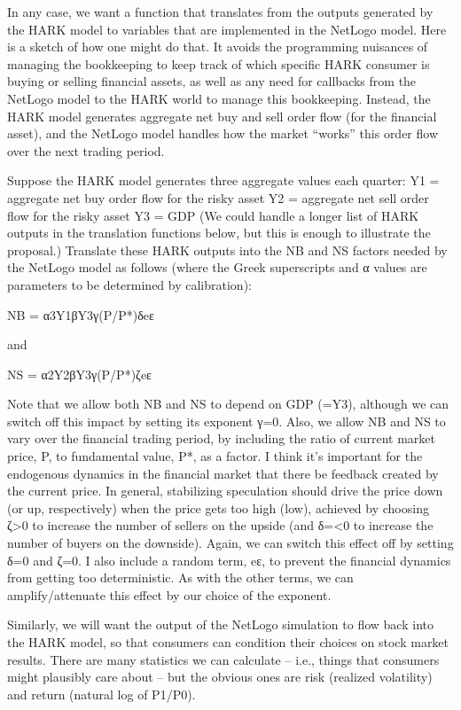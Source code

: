 In any case, we want a function that translates from the outputs
generated by the HARK model to variables that are implemented in
the NetLogo model. Here is a sketch of how one might do that.
It avoids the programming nuisances of managing the bookkeeping
to keep track of which specific HARK consumer is buying or
selling financial assets, as well as any need for callbacks from the
NetLogo model to the HARK world to manage this bookkeeping. Instead,
the HARK model generates aggregate net buy and sell order flow (for
the financial asset), and the NetLogo model handles how the market
“works” this order flow over the next trading period. 

Suppose the HARK model generates three aggregate values each quarter:
Y1 = aggregate net buy order flow for the risky asset
Y2 = aggregate net sell order flow for the risky asset
Y3 = GDP
(We could handle a longer list of HARK outputs in the translation
functions below, but this is enough to illustrate the proposal.)
Translate these HARK outputs into the NB and NS factors needed by the
NetLogo model as follows (where the Greek superscripts and α values are
parameters to be determined by calibration):

NB = α3Y1βY3γ(P/P*)δeε

and
 
NS = α2Y2βY3γ(P/P*)ζeε 

Note that we allow both NB and NS to depend on GDP (=Y3), although we can
switch off this impact by setting its exponent γ=0. Also, we allow NB and NS
to vary over the financial trading period, by including the ratio of current
market price, P, to fundamental value, P*, as a factor. I think it’s important
for the endogenous dynamics in the financial market that there be feedback
created by the current price. In general, stabilizing speculation should
drive the price down (or up, respectively) when the price gets too high (low),
achieved by choosing ζ>0 to increase the number of sellers on the upside
(and δ=<0 to increase the number of buyers on the downside).
Again, we can switch this effect off by setting δ=0 and ζ=0. I also
include a random term, eε, to prevent the financial dynamics from getting
too deterministic. As with the other terms, we can amplify/attenuate this
effect by our choice of the exponent.

Similarly, we will want the output of the NetLogo simulation to flow back
into the HARK model, so that consumers can condition their choices on
stock market results. There are many statistics we can calculate -- i.e.,
things that consumers might plausibly care about -- but the obvious ones
are risk (realized volatility) and return (natural log of P1/P0). 

